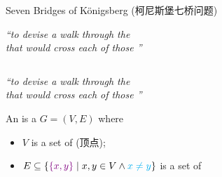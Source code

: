 
\begin{frame}{}
  \begin{center}
    Seven Bridges of K\"onigsberg (柯尼斯堡七桥问题)
  \end{center}

  \pause
  \begin{center}
    {\it ``to devise a walk through the  \\
    that would cross each of those  ''}
  \end{center}
\end{frame}

\begin{frame}{}
  \begin{columns}
  \end{columns}
\end{frame}

\begin{frame}{}
  \begin{columns}
  \end{columns}

  \pause
  \vspace{0.60cm}
  \begin{center}
    {\it ``to devise a walk through the  \\
    that would cross each of those  ''}
  \end{center}
\end{frame}

\begin{frame}{}
  \begin{definition}[Graph (图)]
    An  is a  $G = (V, E)$ where \\[6pt]
    \begin{itemize}
      \setlength{\itemsep}{5pt}
      \item $V$ is a set of  (顶点);
      \item $E \subseteq \{\textcolor{violet}{\{x, y\}} \mid x, y \in V \land \textcolor{cyan}{x \neq y}\}$
        is a set of 
    \end{itemize}
  \end{definition}

  \vspace{0.30cm}
\end{frame}

